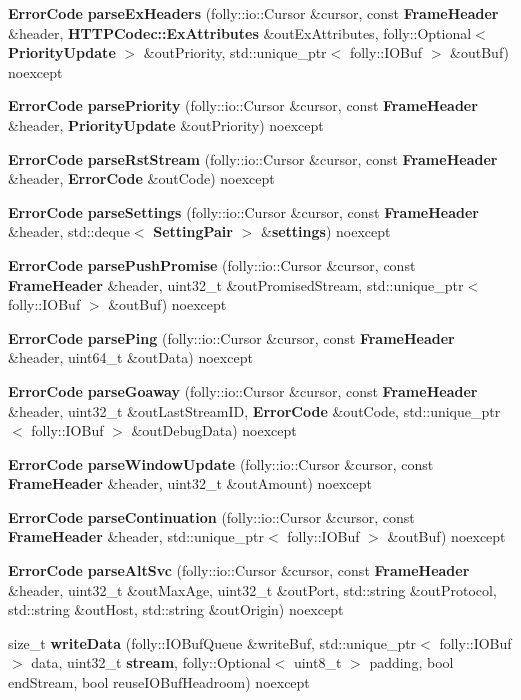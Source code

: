 \begin{DoxyCompactItemize}
\item 
{\bf Error\+Code} {\bf parse\+Ex\+Headers} (folly\+::io\+::\+Cursor \&cursor, const {\bf Frame\+Header} \&header, {\bf H\+T\+T\+P\+Codec\+::\+Ex\+Attributes} \&out\+Ex\+Attributes, folly\+::\+Optional$<$ {\bf Priority\+Update} $>$ \&out\+Priority, std\+::unique\+\_\+ptr$<$ folly\+::\+I\+O\+Buf $>$ \&out\+Buf) noexcept
\item 
{\bf Error\+Code} {\bf parse\+Priority} (folly\+::io\+::\+Cursor \&cursor, const {\bf Frame\+Header} \&header, {\bf Priority\+Update} \&out\+Priority) noexcept
\item 
{\bf Error\+Code} {\bf parse\+Rst\+Stream} (folly\+::io\+::\+Cursor \&cursor, const {\bf Frame\+Header} \&header, {\bf Error\+Code} \&out\+Code) noexcept
\item 
{\bf Error\+Code} {\bf parse\+Settings} (folly\+::io\+::\+Cursor \&cursor, const {\bf Frame\+Header} \&header, std\+::deque$<$ {\bf Setting\+Pair} $>$ \&{\bf settings}) noexcept
\item 
{\bf Error\+Code} {\bf parse\+Push\+Promise} (folly\+::io\+::\+Cursor \&cursor, const {\bf Frame\+Header} \&header, uint32\+\_\+t \&out\+Promised\+Stream, std\+::unique\+\_\+ptr$<$ folly\+::\+I\+O\+Buf $>$ \&out\+Buf) noexcept
\item 
{\bf Error\+Code} {\bf parse\+Ping} (folly\+::io\+::\+Cursor \&cursor, const {\bf Frame\+Header} \&header, uint64\+\_\+t \&out\+Data) noexcept
\item 
{\bf Error\+Code} {\bf parse\+Goaway} (folly\+::io\+::\+Cursor \&cursor, const {\bf Frame\+Header} \&header, uint32\+\_\+t \&out\+Last\+Stream\+ID, {\bf Error\+Code} \&out\+Code, std\+::unique\+\_\+ptr$<$ folly\+::\+I\+O\+Buf $>$ \&out\+Debug\+Data) noexcept
\item 
{\bf Error\+Code} {\bf parse\+Window\+Update} (folly\+::io\+::\+Cursor \&cursor, const {\bf Frame\+Header} \&header, uint32\+\_\+t \&out\+Amount) noexcept
\item 
{\bf Error\+Code} {\bf parse\+Continuation} (folly\+::io\+::\+Cursor \&cursor, const {\bf Frame\+Header} \&header, std\+::unique\+\_\+ptr$<$ folly\+::\+I\+O\+Buf $>$ \&out\+Buf) noexcept
\item 
{\bf Error\+Code} {\bf parse\+Alt\+Svc} (folly\+::io\+::\+Cursor \&cursor, const {\bf Frame\+Header} \&header, uint32\+\_\+t \&out\+Max\+Age, uint32\+\_\+t \&out\+Port, std\+::string \&out\+Protocol, std\+::string \&out\+Host, std\+::string \&out\+Origin) noexcept
\item 
size\+\_\+t {\bf write\+Data} (folly\+::\+I\+O\+Buf\+Queue \&write\+Buf, std\+::unique\+\_\+ptr$<$ folly\+::\+I\+O\+Buf $>$ data, uint32\+\_\+t {\bf stream}, folly\+::\+Optional$<$ uint8\+\_\+t $>$ padding, bool end\+Stream, bool reuse\+I\+O\+Buf\+Headroom) noexcept

\end{DoxyCompactItemize}
